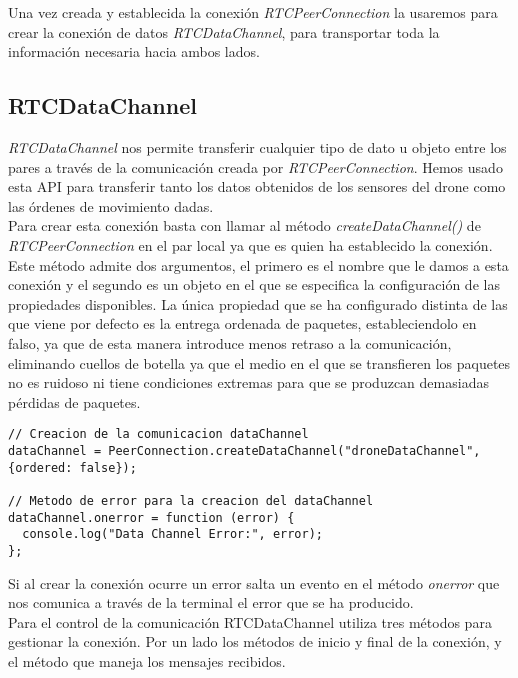 Una vez creada y establecida la conexión \emph{RTCPeerConnection} la usaremos para crear la conexión de datos \emph{RTCDataChannel}, para transportar toda la información necesaria hacia ambos lados.\\


\subsection{RTCDataChannel}

\emph{RTCDataChannel} nos permite transferir cualquier tipo de dato u objeto entre los pares a través de la comunicación creada por \emph{RTCPeerConnection}. Hemos usado esta API para transferir tanto los datos obtenidos de los sensores del drone como las órdenes de movimiento dadas.\\

Para crear esta conexión basta con llamar al método \emph{createDataChannel()} de \emph{RTCPeerConnection} en el par local ya que es quien ha establecido la conexión. Este método admite dos argumentos, el primero es el nombre que le damos a esta conexión y el segundo es un objeto en el que se especifica la configuración de las propiedades disponibles. La única propiedad que se ha configurado distinta de las que viene por defecto es la entrega ordenada de paquetes, estableciendolo en falso, ya que de esta manera introduce menos retraso a la comunicación, eliminando cuellos de botella ya que el medio en el que se transfieren los paquetes no es ruidoso ni tiene condiciones extremas para que se produzcan demasiadas pérdidas de paquetes.\\

\begin{lstlisting}[caption=Establecimiento conexión RTCDataChannlel en el par local.]
// Creacion de la comunicacion dataChannel
dataChannel = PeerConnection.createDataChannel("droneDataChannel", {ordered: false});

// Metodo de error para la creacion del dataChannel
dataChannel.onerror = function (error) {
  console.log("Data Channel Error:", error);
};\end{lstlisting}

Si al crear la conexión ocurre un error salta un evento en el método \emph{onerror} que nos comunica a través de la terminal el error que se ha producido.\\

Para el control de la comunicación RTCDataChannel utiliza tres métodos para gestionar la conexión. Por un lado los métodos de inicio y final de la conexión, y el método que maneja los mensajes recibidos.\\

